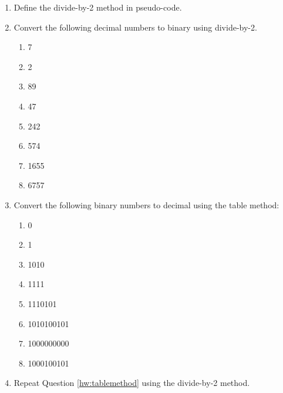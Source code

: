 \begin{multicols*}{2}
\begin{enumerate}[label=\thechapter.\arabic*]
\begin{multicols*}{2}
\begin{enumerate}
            \item 0
            \item 1
            \item 23
            \item 59
            \item 100
            \item 1200
            \item 1092
            \item 1000000
        \end{enumerate}
    \end{multicols*}
    \item Define the divide-by-2 method in pseudo-code.
    \item Convert the following decimal numbers to binary using \gls{divide-by-2}.
    \begin{multicols*}{2}
        \begin{enumerate}
            \item 7
            \item 2
            \item 89
            \item 47
            \item 242
            \item 574
            \item 1655
            \item 6757
        \end{enumerate}
    \end{multicols*}
    \item Convert the following binary numbers to decimal using the table method:\label{hw:tablemethod}
    \begin{enumerate}
        \item 0
        \item 1
        \item 1010
        \item 1111
        \item 1110101
        \item 1010100101
        \item 1000000000
        \item 1000100101
    \end{enumerate}
    \item Repeat Question \ref{hw:tablemethod} using the divide-by-2 method. 
   \end{enumerate} 
\end{multicols*}
